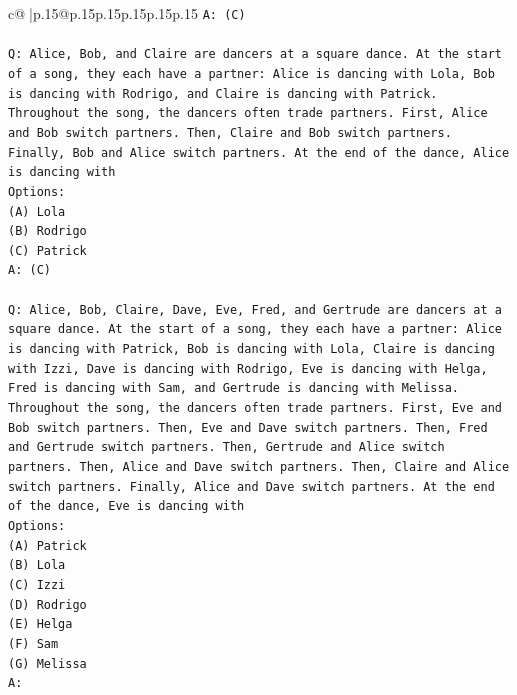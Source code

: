 \documentclass{article}
\begin{document}
{\begin{supertabular}{c@{$\;$}|p{.15\linewidth}@{}p{.15\linewidth}p{.15\linewidth}p{.15\linewidth}p{.15\linewidth}p{.15\linewidth}}
{{{\texttt{A: (C)} \\
\\ 
\texttt{Q: Alice, Bob, and Claire are dancers at a square dance. At the start of a song, they each have a partner: Alice is dancing with Lola, Bob is dancing with Rodrigo, and Claire is dancing with Patrick.} \\
\texttt{Throughout the song, the dancers often trade partners. First, Alice and Bob switch partners. Then, Claire and Bob switch partners. Finally, Bob and Alice switch partners. At the end of the dance, Alice is dancing with} \\
\texttt{Options:} \\
\texttt{(A) Lola} \\
\texttt{(B) Rodrigo} \\
\texttt{(C) Patrick} \\
\texttt{A: (C)} \\
\\ 
\texttt{Q: Alice, Bob, Claire, Dave, Eve, Fred, and Gertrude are dancers at a square dance. At the start of a song, they each have a partner: Alice is dancing with Patrick, Bob is dancing with Lola, Claire is dancing with Izzi, Dave is dancing with Rodrigo, Eve is dancing with Helga, Fred is dancing with Sam, and Gertrude is dancing with Melissa.} \\
\texttt{Throughout the song, the dancers often trade partners. First, Eve and Bob switch partners. Then, Eve and Dave switch partners. Then, Fred and Gertrude switch partners. Then, Gertrude and Alice switch partners. Then, Alice and Dave switch partners. Then, Claire and Alice switch partners. Finally, Alice and Dave switch partners. At the end of the dance, Eve is dancing with} \\
\texttt{Options:} \\
\texttt{(A) Patrick} \\
\texttt{(B) Lola} \\
\texttt{(C) Izzi} \\
\texttt{(D) Rodrigo} \\
\texttt{(E) Helga} \\
\texttt{(F) Sam} \\
\texttt{(G) Melissa} \\
\texttt{A:} \\
            }
        }
    }
     \\ \\


\end{supertabular}}
\end{document}
